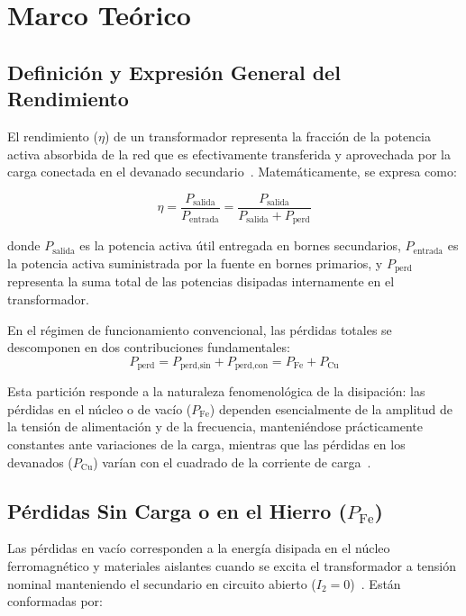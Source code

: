 \section{Marco Teórico}

\subsection{Definición y Expresión General del Rendimiento}

El rendimiento ($\eta$) de un transformador representa la fracción de la potencia activa absorbida de la red que es efectivamente transferida y aprovechada por la carga conectada en el devanado secundario~\cite{covenin536, chapman}. Matemáticamente, se expresa como:

\begin{equation}
    \eta = \frac{P_{\text{salida}}}{P_{\text{entrada}}} = \frac{P_{\text{salida}}}{P_{\text{salida}} + P_{\text{perd}}}
    \label{eq:rendimiento_def}
\end{equation}

donde $P_{\text{salida}}$ es la potencia activa útil entregada en bornes secundarios, $P_{\text{entrada}}$ es la potencia activa suministrada por la fuente en bornes primarios, y $P_{\text{perd}}$ representa la suma total de las potencias disipadas internamente en el transformador.

En el régimen de funcionamiento convencional, las pérdidas totales se descomponen en dos contribuciones fundamentales:
\begin{equation}
    P_{\text{perd}} = P_{\text{perd,sin}} + P_{\text{perd,con}} = P_{\text{Fe}} + P_{\text{Cu}}
\end{equation}

Esta partición responde a la naturaleza fenomenológica de la disipación: las pérdidas en el núcleo o de vacío ($P_{\text{Fe}}$) dependen esencialmente de la amplitud de la tensión de alimentación y de la frecuencia, manteniéndose prácticamente constantes ante variaciones de la carga, mientras que las pérdidas en los devanados ($P_{\text{Cu}}$) varían con el cuadrado de la corriente de carga~\cite{mit, ras}.

\subsection{Pérdidas Sin Carga o en el Hierro (\texorpdfstring{$P_{\text{Fe}}$}{P\_Fe})}

Las pérdidas en vacío corresponden a la energía disipada en el núcleo ferromagnético y materiales aislantes cuando se excita el transformador a tensión nominal manteniendo el secundario en circuito abierto ($I_2 = 0$)~\cite{chapman}. Están conformadas por:

